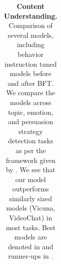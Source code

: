 \begin{table}[!htbp]
\begin{minipage}
\begin{adjustbox}{max width = 1.0\textwidth}
\begin{tabular}{llcccccccc}
\end{tabular}
\end{adjustbox}
\caption{\textbf{Content Understanding.} Comparison of several models, including behavior instruction tuned models before and after BFT. We compare the models across topic, emotion, and persuasion strategy detection tasks as per the framework given by \citet{bhattacharya2023video}. We see that our model outperforms similarly sized models (Vicuna, VideoChat) in most tasks. Best models are denoted in  and runner-ups in .\label{tab:content-understanding}}\end{minipage}
\end{table}











